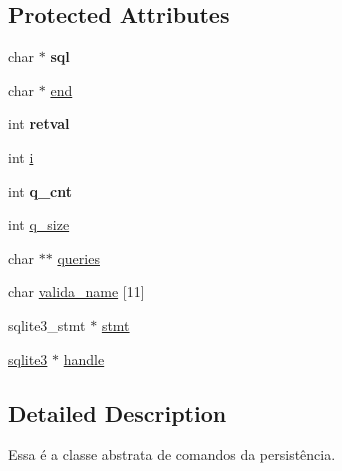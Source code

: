 \subsection*{Protected Attributes}
\begin{DoxyCompactItemize}
\item 
\hypertarget{class_a_command_a8047bfd0b2365b5e82cfae6f4a894ce1}{char $\ast$ {\bfseries sql}}\label{class_a_command_a8047bfd0b2365b5e82cfae6f4a894ce1}

\item 
char $\ast$ \hyperlink{class_a_command_ac36454f9da108ff845c6303c8d7f70ae}{end}
\item 
\hypertarget{class_a_command_a435e761a4eb4fa339a0669a53430bd52}{int {\bfseries retval}}\label{class_a_command_a435e761a4eb4fa339a0669a53430bd52}

\item 
int \hyperlink{class_a_command_aa011a4976cefd5da8bd7e8231809f19d}{i}
\item 
\hypertarget{class_a_command_a41a087661bd8e5f7e7ff029ebddb3978}{int {\bfseries q\-\_\-cnt}}\label{class_a_command_a41a087661bd8e5f7e7ff029ebddb3978}

\item 
int \hyperlink{class_a_command_a769e24f33dec6fbffac667052257d575}{q\-\_\-size}
\item 
char $\ast$$\ast$ \hyperlink{class_a_command_a6a34b07a8ab76688ad3a60bfba71c03a}{queries}
\item 
char \hyperlink{class_a_command_a92ecbf13bd3238cd74125505954d211f}{valida\-\_\-name} \mbox{[}11\mbox{]}
\item 
sqlite3\-\_\-stmt $\ast$ \hyperlink{class_a_command_a7ecdb33c925dc75b9538a4009ff88c6c}{stmt}
\item 
\hyperlink{structsqlite3}{sqlite3} $\ast$ \hyperlink{class_a_command_a6f48bd41253cbcc5e766c222776e4931}{handle}
\end{DoxyCompactItemize}


\subsection{Detailed Description}
Essa é a classe abstrata de comandos da persistência. 

